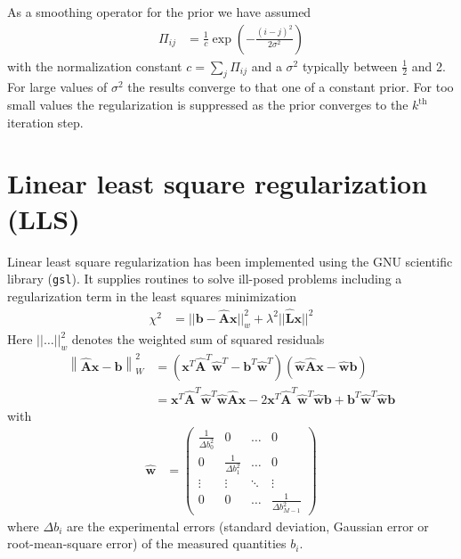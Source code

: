 As a smoothing operator for the prior we have assumed
\begin{align}\label{eq:smoothingOp4prior}
  \Pi_{ij} &= \frac{1}{c}\exp\left(-\frac{(i-j)^2}{2\sigma^2}\right)
\end{align}
with the normalization constant $c=\sum_j \Pi_{ij}$ and a $\sigma^2$ typically between $\frac12$ and 2. For large values of $\sigma^2$ the results converge to that one of a constant prior. For too small values the regularization is suppressed as the prior converges to the $k^\mathrm{th}$ iteration step.


\section{Linear least square regularization (LLS)}
\label{sec:LLS}
Linear least square regularization has been implemented using the GNU scientific library (\texttt{gsl}). It supplies routines to solve ill-posed problems including a regularization term in the least squares minimization
\begin{align}\label{eq:LLSreg}
  \chi^2 &= || \mathbf{b} - \hat{\mathbf{A}}\mathbf{x} ||_{w}^2 + \lambda^2 || \hat{\mathbf{L}} \mathbf{x} ||^2
\end{align}
Here $|| \dots ||_{w}^2$ denotes the weighted sum of squared residuals
\begin{align}\label{eq:wSumSR}
\left\| \hat{\mathbf{A}}\mathbf{x}-\mathbf{b}\right\|_W^2
&= \left(\mathbf{x}^T\hat{\mathbf{A}}^T\hat{\mathbf{w}}^T-\mathbf{b}^T\hat{\mathbf{w}}^T\right)\left(\hat{\mathbf{w}}\hat{\mathbf{A}}\mathbf{x}-\hat{\mathbf{w}}\mathbf{b}\right)\\
&= \mathbf{x}^T\hat{\mathbf{A}}^T\hat{\mathbf{w}}^T\hat{\mathbf{w}}\hat{\mathbf{A}}\mathbf{x}-2 \mathbf{x}^T\hat{\mathbf{A}}^T\hat{\mathbf{w}}^T\hat{\mathbf{w}}\mathbf{b}+\mathbf{b}^T\hat{\mathbf{w}}^T\hat{\mathbf{w}}\mathbf{b}
\end{align}
with
\begin{align}
  \hat{\mathbf{w}} &=
  \begin{pmatrix}
    \frac{1}{\Delta b_0^2} & 0 & \dots & 0 \\
    0 & \frac{1}{\Delta b_1^2} & \dots & 0 \\
    \vdots & \vdots & \ddots & \vdots \\
    0 & 0 & \dots & \frac{1}{\Delta b_{M-1}^2}
  \end{pmatrix}
\end{align}
where $\Delta b_i$ are the experimental errors (standard deviation, Gaussian error or root-mean-square error) of the measured quantities $b_i$.
